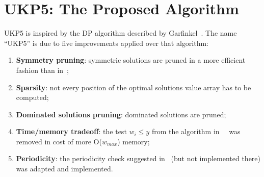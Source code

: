 \documentclass[runningheads,a4paper]{llncs}
\begin{document}
\section{UKP5: The Proposed Algorithm}
\label{sec:ukp5}

UKP5 is inspired by the DP algorithm described by Garfinkel~\cite[p. 221]{gar72}. 
The name ``UKP5'' is due to five improvements applied over that algorithm:

\begin{enumerate}
  \item \textbf{Symmetry pruning}: symmetric solutions are pruned in a more efficient fashion than in~\cite{gar72};
  \item \textbf{Sparsity}: not every position of the optimal solutions value array has to be computed;
  \item \textbf{Dominated solutions pruning}: dominated solutions are pruned;
  \item \textbf{Time/memory tradeoff}: the test \(w_i \leq y\) from the algorithm in~~\cite{gar72} was removed in cost of more O(\(w_{max}\)) memory;
  \item \textbf{Periodicity}: the periodicity check suggested in~\cite{gar72} (but not implemented there) was adapted and implemented.
\end{enumerate}
\end{document}
